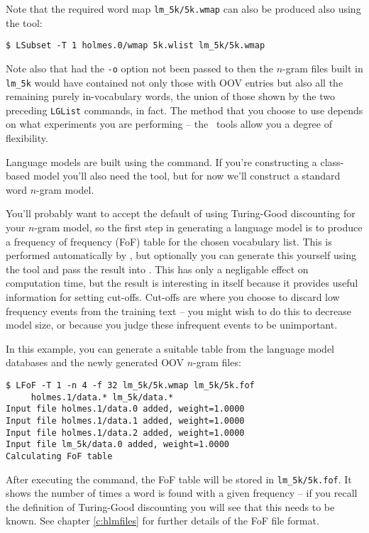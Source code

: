 Note that the required word map \texttt{lm\_5k/5k.wmap} can also be
produced also using the  tool:
\begin{verbatim}
$ LSubset -T 1 holmes.0/wmap 5k.wlist lm_5k/5k.wmap
\end{verbatim} %

Note also that had the {\tt -o} option not been passed to
 then the $n$-gram files built in {\tt lm\_5k} would have
contained not only those with OOV entries but also all the remaining
purely in-vocabulary words, the union of those shown by the two
preceding {\tt LGList} commands, in fact.  The method that you choose
to use depends on what experiments you are performing -- the \HTK\
tools allow you a degree of flexibility.


Language models are built using the  command.  If you're
constructing a class-based model you'll also need the \htool{Cluster}
tool, but for now we'll construct a standard word $n$-gram model.

You'll probably want to accept the default of using Turing-Good
discounting for your $n$-gram model, so the first step in generating a
language model is to produce a frequency of frequency (FoF) table for
the chosen vocabulary list.  This is performed automatically by
, but optionally you can generate this yourself using
the \htool{LFoF} tool and pass the result into \htool{LBuild}.  This
has only a negligable effect on computation time, but the result is
interesting in itself because it provides useful information for
setting cut-offs.  Cut-offs are where you choose to discard low
frequency events from the training text -- you might wish to do this
to decrease model size, or because you judge these infrequent events
to be unimportant.

In this example, you can generate a suitable table from the language
model databases and the newly generated OOV $n$-gram files:
\begin{verbatim}
$ LFoF -T 1 -n 4 -f 32 lm_5k/5k.wmap lm_5k/5k.fof
     holmes.1/data.* lm_5k/data.*
Input file holmes.1/data.0 added, weight=1.0000
Input file holmes.1/data.1 added, weight=1.0000
Input file holmes.1/data.2 added, weight=1.0000
Input file lm_5k/data.0 added, weight=1.0000
Calculating FoF table
\end{verbatim} %

After executing the command, the FoF table will be stored in
\texttt{lm\_5k/5k.fof}.  It shows the number of times a word is found
with a given frequency -- if you recall the definition of Turing-Good
discounting you will see that this needs to be known.  See chapter
\ref{c:hlmfiles} for further details of the FoF file format.

